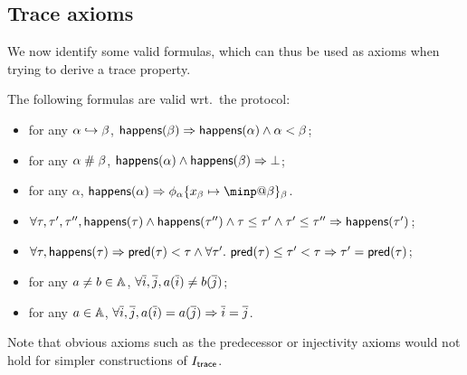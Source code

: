 \subsection{Trace axioms}

We now identify some valid formulas, which can thus be used as axioms
when trying to derive a trace property.

\begin{proposition}
  The following formulas are valid wrt.\ the protocol:
  \begin{itemize}
    \item for any $\alpha \hookrightarrow \beta$,
      $\textsf{happens}(\beta) \Rightarrow \textsf{happens}(\alpha) \wedge \alpha < \beta$;
    \item for any $\alpha \mathrel{\#} \beta$,
      $\textsf{happens}(\alpha)\wedge\textsf{happens}(\beta) \Rightarrow \bot$;
    \item for any $\alpha$,
      $\happens(\alpha) \Rightarrow
      \phi_\alpha\{x_\beta\mapsto\minp@\beta\}_\beta$.
    \item
      $\forall \tau,\tau',\tau'', \textsf{happens}(\tau)\wedge\textsf{happens}(\tau'')\wedge
      \tau\leq\tau'\wedge\tau'\leq\tau''\Rightarrow\textsf{happens}(\tau')$;
    \item
      $\forall \tau, \textsf{happens}(\tau) \Rightarrow \textsf{pred}(\tau)<\tau \wedge
      \forall \tau'.~ \textsf{pred}(\tau)\leq\tau'<\tau \Rightarrow
      \tau'=\textsf{pred}(\tau)$;
    \item for any $a\neq b\in\mathbb{A}$,
      $\forall \overline{i},\overline{j}, a(\overline{i})\neq b(\overline{j})$;
    \item for any $a\in\mathbb{A}$,
      $\forall \overline{i},\overline{j}, a(\overline{i})=a(\overline{j}) \Rightarrow \overline{i}=\overline{j}$.
  \end{itemize}
\end{proposition}

Note that obvious axioms such as the predecessor or injectivity axioms
would not hold for simpler constructions of $I_{\textsf{trace}}$.
